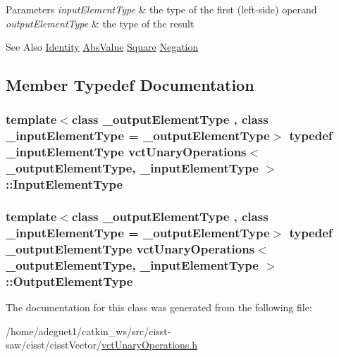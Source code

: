 \begin{DoxyParams}{Parameters}
{\em input\-Element\-Type} & the type of the first (left-\/side) operand \\
\hline
{\em output\-Element\-Type} & the type of the result\\
\hline
\end{DoxyParams}
\begin{DoxySeeAlso}{See Also}
\hyperlink{classvct_unary_operations_1_1_identity}{Identity} \hyperlink{classvct_unary_operations_1_1_abs_value}{Abs\-Value} \hyperlink{classvct_unary_operations_1_1_square}{Square} \hyperlink{classvct_unary_operations_1_1_negation}{Negation} 
\end{DoxySeeAlso}


\subsection{Member Typedef Documentation}
\hypertarget{classvct_unary_operations_abf3b77bb7b8abd7ba72a6a45a65696a7}{
\subsubsection[{Input\-Element\-Type}]{\setlength{\rightskip}{0pt plus 5cm}template$<$class \-\_\-output\-Element\-Type , class \-\_\-input\-Element\-Type  = \-\_\-output\-Element\-Type$>$ typedef \-\_\-input\-Element\-Type {\bf vct\-Unary\-Operations}$<$ \-\_\-output\-Element\-Type, \-\_\-input\-Element\-Type $>$\-::{\bf Input\-Element\-Type}}}\label{classvct_unary_operations_abf3b77bb7b8abd7ba72a6a45a65696a7}
\hypertarget{classvct_unary_operations_a42306ac3dd20d32c6d6c66ac3fa2e7b9}{
\subsubsection[{Output\-Element\-Type}]{\setlength{\rightskip}{0pt plus 5cm}template$<$class \-\_\-output\-Element\-Type , class \-\_\-input\-Element\-Type  = \-\_\-output\-Element\-Type$>$ typedef \-\_\-output\-Element\-Type {\bf vct\-Unary\-Operations}$<$ \-\_\-output\-Element\-Type, \-\_\-input\-Element\-Type $>$\-::{\bf Output\-Element\-Type}}}\label{classvct_unary_operations_a42306ac3dd20d32c6d6c66ac3fa2e7b9}


The documentation for this class was generated from the following file\-:\begin{DoxyCompactItemize}
\item 
/home/adeguet1/catkin\-\_\-ws/src/cisst-\/saw/cisst/cisst\-Vector/\hyperlink{vct_unary_operations_8h}{vct\-Unary\-Operations.\-h}\end{DoxyCompactItemize}
